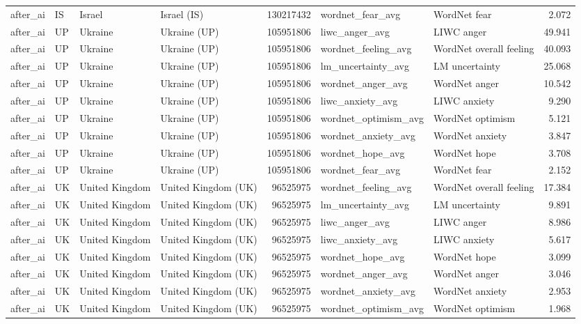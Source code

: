 \begin{tabular}{llllrllr}
after\_ai & IS & Israel & Israel (IS) & 130217432 & wordnet\_fear\_avg & WordNet fear & 2.072 \\
after\_ai & UP & Ukraine & Ukraine (UP) & 105951806 & liwc\_anger\_avg & LIWC anger & 49.941 \\
after\_ai & UP & Ukraine & Ukraine (UP) & 105951806 & wordnet\_feeling\_avg & WordNet overall feeling & 40.093 \\
after\_ai & UP & Ukraine & Ukraine (UP) & 105951806 & lm\_uncertainty\_avg & LM uncertainty & 25.068 \\
after\_ai & UP & Ukraine & Ukraine (UP) & 105951806 & wordnet\_anger\_avg & WordNet anger & 10.542 \\
after\_ai & UP & Ukraine & Ukraine (UP) & 105951806 & liwc\_anxiety\_avg & LIWC anxiety & 9.290 \\
after\_ai & UP & Ukraine & Ukraine (UP) & 105951806 & wordnet\_optimism\_avg & WordNet optimism & 5.121 \\
after\_ai & UP & Ukraine & Ukraine (UP) & 105951806 & wordnet\_anxiety\_avg & WordNet anxiety & 3.847 \\
after\_ai & UP & Ukraine & Ukraine (UP) & 105951806 & wordnet\_hope\_avg & WordNet hope & 3.708 \\
after\_ai & UP & Ukraine & Ukraine (UP) & 105951806 & wordnet\_fear\_avg & WordNet fear & 2.152 \\
after\_ai & UK & United Kingdom & United Kingdom (UK) & 96525975 & wordnet\_feeling\_avg & WordNet overall feeling & 17.384 \\
after\_ai & UK & United Kingdom & United Kingdom (UK) & 96525975 & lm\_uncertainty\_avg & LM uncertainty & 9.891 \\
after\_ai & UK & United Kingdom & United Kingdom (UK) & 96525975 & liwc\_anger\_avg & LIWC anger & 8.986 \\
after\_ai & UK & United Kingdom & United Kingdom (UK) & 96525975 & liwc\_anxiety\_avg & LIWC anxiety & 5.617 \\
after\_ai & UK & United Kingdom & United Kingdom (UK) & 96525975 & wordnet\_hope\_avg & WordNet hope & 3.099 \\
after\_ai & UK & United Kingdom & United Kingdom (UK) & 96525975 & wordnet\_anger\_avg & WordNet anger & 3.046 \\
after\_ai & UK & United Kingdom & United Kingdom (UK) & 96525975 & wordnet\_anxiety\_avg & WordNet anxiety & 2.953 \\
after\_ai & UK & United Kingdom & United Kingdom (UK) & 96525975 & wordnet\_optimism\_avg & WordNet optimism & 1.968 \\

\end{tabular}
